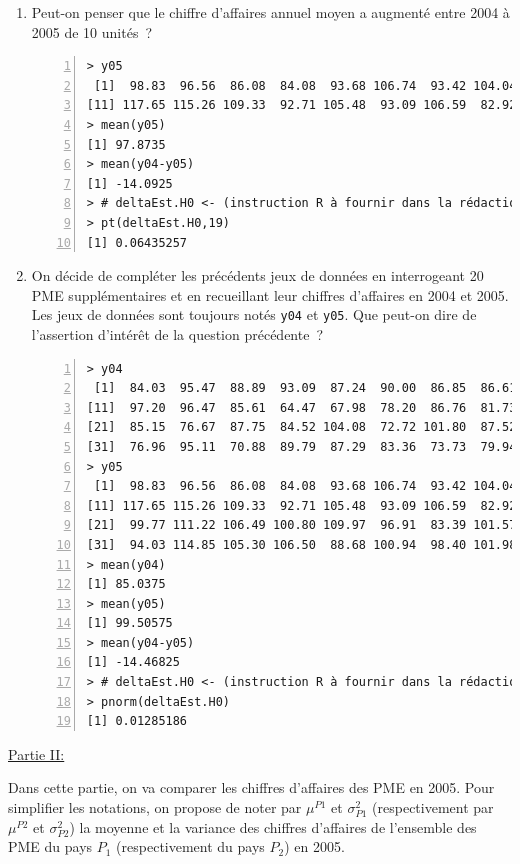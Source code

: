 \documentclass[10pt]{report}
\begin{document}
\begin{exercice}
\begin{enumerate}
 




\item Peut-on penser que le chiffre d'affaires annuel moyen a augmenté entre 2004 à 2005  de 10 unités~?

\IndicR
\begin{Verbatim}[frame=leftline,fontfamily=tt,fontshape=n,numbers=left]
> y05
 [1]  98.83  96.56  86.08  84.08  93.68 106.74  93.42 104.04  99.24  87.47
[11] 117.65 115.26 109.33  92.71 105.48  93.09 106.59  82.92  96.31  87.99
> mean(y05)
[1] 97.8735
> mean(y04-y05)
[1] -14.0925
> # deltaEst.H0 <- (instruction R à fournir dans la rédaction)
> pt(deltaEst.H0,19)
[1] 0.06435257
\end{Verbatim}

 





\item On décide de compléter les précédents jeux de données en interrogeant 20 PME supplémentaires et en recueillant leur chiffres d'affaires en 2004 et 2005. Les jeux de données sont toujours notés \texttt{y04} et \texttt{y05}. Que peut-on dire de l'assertion d'intérêt de la question précédente~?

\IndicR
\begin{Verbatim}[frame=leftline,fontfamily=tt,fontshape=n,numbers=left]
> y04
 [1]  84.03  95.47  88.89  93.09  87.24  90.00  86.85  86.61  73.24  73.88
[11]  97.20  96.47  85.61  64.47  67.98  78.20  86.76  81.73  74.35  83.55
[21]  85.15  76.67  87.75  84.52 104.08  72.72 101.80  87.52  86.61  89.96
[31]  76.96  95.11  70.88  89.79  87.29  83.36  73.73  79.94  91.97 100.07
> y05
 [1]  98.83  96.56  86.08  84.08  93.68 106.74  93.42 104.04  99.24  87.47
[11] 117.65 115.26 109.33  92.71 105.48  93.09 106.59  82.92  96.31  87.99
[21]  99.77 111.22 106.49 100.80 109.97  96.91  83.39 101.57 100.10 110.07
[31]  94.03 114.85 105.30 106.50  88.68 100.94  98.40 101.98 112.11  79.68
> mean(y04)
[1] 85.0375
> mean(y05)
[1] 99.50575
> mean(y04-y05)
[1] -14.46825
> # deltaEst.H0 <- (instruction R à fournir dans la rédaction)
> pnorm(deltaEst.H0)
[1] 0.01285186
\end{Verbatim}

 



\end{enumerate}


\noindent \underline{Partie II:}

Dans cette partie, on va comparer les chiffres d'affaires des PME en 2005. Pour simplifier les notations, on propose de noter par $\mu^{P1}$ et $\sigma^2_{P1}$ (respectivement par $\mu^{P2}$ et $\sigma^2_{P2}$) la moyenne et la variance des chiffres d'affaires de l'ensemble des PME du pays $P_1$ (respectivement du pays $P_2$) en 2005.


\end{exercice}
\end{document}
